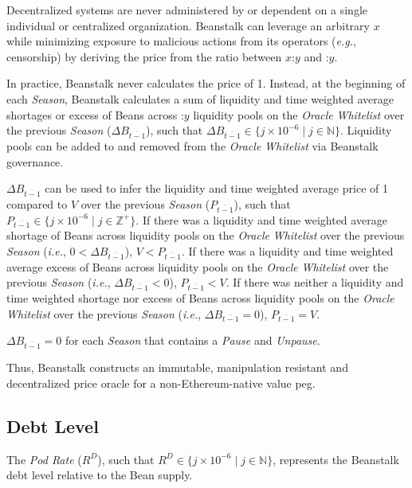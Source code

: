 \documentclass[tikz]{article}
\newcommand{\term}[1]{\textsl{#1}}
\newcommand{\Bean}{} %
\begin{document}
Decentralized systems are never administered by or dependent on a single individual or centralized organization. Beanstalk can leverage an arbitrary $x$ while minimizing exposure to malicious actions from its operators (\term{e.g.}, censorship) by deriving the price from the ratio between $x$:$y$ and \Bean:$y$.

In practice, Beanstalk never calculates the price of \Bean1. Instead, at the beginning of each \term{Season}, Beanstalk calculates a sum of liquidity and time weighted average shortages or excess of Beans across \Bean:$y$ liquidity pools on the \term{Oracle} \term{Whitelist} over the previous \term{Season} ($\Delta B_{\overline{t-1}}$), such that $\Delta B_{\overline{t-1}} \in \{j \times 10^{-6} \mid j \in \mathbb{N} \}$. Liquidity pools can be added to and removed from the \term{Oracle} \term{Whitelist} via Beanstalk governance. 

$\Delta B_{\overline{t-1}}$ can be used to infer the liquidity and time weighted average price of \Bean1 compared to $V$ over the previous \term{Season} ($P_{\overline{t-1}}$), such that $P_{\overline{t-1}} \in \{j \times 10^{-6} \mid j \in \mathbb{Z}^{+} \}$. If there was a liquidity and time weighted average shortage of Beans across liquidity pools on the \term{Oracle} \term{Whitelist} over the previous \term{Season} (\term{i.e.}, $0 < \Delta B_{\overline{t-1}}$), $V < P_{\overline{t-1}}$. If there was a liquidity and time weighted average excess of Beans across liquidity pools on the \term{Oracle} \term{Whitelist} over the previous \term{Season} (\term{i.e.}, $\Delta B_{\overline{t-1}} < 0$), $P_{\overline{t-1}} < V$. If there was neither a liquidity and time weighted shortage nor excess of Beans across liquidity pools on the \term{Oracle} \term{Whitelist} over the previous \term{Season} (\term{i.e.}, $\Delta B_{\overline{t-1}} = 0$), $P_{\overline{t-1}} = V$. 

$\Delta B_{\overline{t-1}} = 0$ for each \term{Season} that contains a \term{Pause} and \term{Unpause}.

Thus, Beanstalk constructs an immutable, manipulation resistant and decentralized price oracle for a non-Ethereum-native value peg.

\subsection{Debt Level}
The \term{Pod Rate} ($R^D$), such that $R^D \in \{j \times 10^{-6} \mid j \in \mathbb{N} \}$, represents the Beanstalk debt level relative to the Bean supply.
\end{document}

